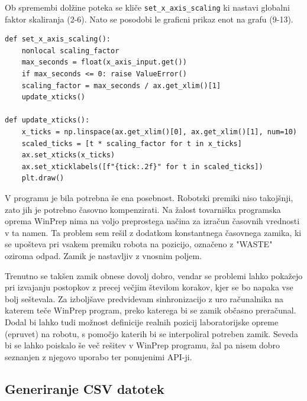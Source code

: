 \documentclass[a4paper,12pt]{article}
\begin{document}
Ob spremembi dolžine poteka se kliče \texttt{set\_x\_axis\_scaling} ki nastavi globalni faktor skaliranja (2-6). Nato se posodobi le graficni prikaz enot na grafu (9-13).
\begin{lstlisting}[caption={Funkcija za nastavitev skaliranja X-osi}, label={lst:xaxisscaling}]
def set_x_axis_scaling():
    nonlocal scaling_factor
    max_seconds = float(x_axis_input.get())
    if max_seconds <= 0: raise ValueError()
    scaling_factor = max_seconds / ax.get_xlim()[1]
    update_xticks()

def update_xticks():
    x_ticks = np.linspace(ax.get_xlim()[0], ax.get_xlim()[1], num=10)
    scaled_ticks = [t * scaling_factor for t in x_ticks]
    ax.set_xticks(x_ticks)
    ax.set_xticklabels([f"{tick:.2f}" for t in scaled_ticks])
    plt.draw()
\end{lstlisting}


V programu je bila potrebna še ena posebnost. Robotski premiki niso takojšnji, zato jih je potrebno časovno kompenzirati. Na žalost tovarniška programska oprema WinPrep nima na voljo preprostega načina za izračun časovnih vrednosti v ta namen. Ta problem sem rešil z dodatkom konstantnega časovnega zamika, ki se upošteva pri vsakem premiku robota na pozicijo, označeno z "WASTE" oziroma odpad. Zamik je nastavljiv z vnosnim poljem.

Trenutno se takšen zamik obnese dovolj dobro, vendar se problemi lahko pokažejo pri izvajanju postopkov z precej večjim številom korakov, kjer se bo napaka vse bolj seštevala. Za izboljšave predvidevam sinhronizacijo z uro računalnika na katerem teče WinPrep program, preko katerega bi se zamik občasno preračunal. Dodal bi lahko tudi možnost definicije realnih pozicij laboratorijske opreme (epruvet) na robotu, s pomočjo katerih bi se interpoliral potreben zamik. Seveda bi se lahko poiskalo še več rešitev v WinPrep programu, žal pa nisem dobro seznanjen z njegovo uporabo ter ponujenimi API-ji.

\subsection{Generiranje CSV datotek}
\end{document}

